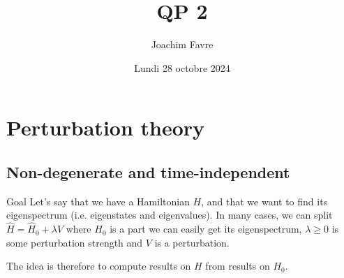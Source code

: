 \documentclass[a4paper]{article}
\title{QP 2}
\author{Joachim Favre}
\date{Lundi 28 octobre 2024}
\begin{document}
\maketitle


\section{Perturbation theory}

\subsection{Non-degenerate and time-independent}

\begin{parag}{Goal}
    Let's say that we have a Hamiltonian $H$, and that we want to find its eigenspectrum (i.e. eigenstates and eigenvalues). In many cases, we can split $\hat{H} = \hat{H}_0 + \lambda \hat{V}$ where $H_0$ is a part we can easily get its eigenspectrum, $\lambda \geq 0$ is some perturbation strength and $V$ is a perturbation.
    
    The idea is therefore to compute results on $H$ from results on $H_0$.
\end{parag}
\end{document}
